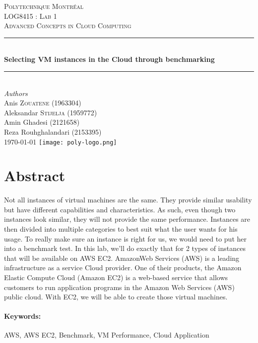 \documentclass[12pt]{article}
\begin{document}
\begin{titlepage} 
	\newcommand{\HRule}{\rule{\linewidth}{0.5mm}}
	\center
	\textsc{\LARGE Polytechnique Montréal}\\[1.5cm]
	\textsc{\Large LOG8415 : Lab 1}\\[0.5cm]
	\textsc{\large Advanced Concepts in Cloud Computing}\\[0.5cm]
	\HRule\\[0.4cm]
	{\huge\bfseries Selecting VM instances in the Cloud through
	benchmarking}\\[0.4cm]
	\HRule\\[1.5cm]
	{\large\textit{Authors}}\\
	Anis \textsc{Zouatene} (1963304)\\
	Aleksandar \textsc{Stijelja} (1959772)\\
	Amin Ghadesi\textsc{} (2121658)\\
        Reza Rouhghalandari \textsc{} (2153395)\\
	\vfill\vfill\vfill {\large\today} \vfill\vfill
	\texttt{[image: poly-logo.png]}\\[1cm]
	\vfill
\end{titlepage}


\section{Abstract}
	\paragraph{} Not all instances of virtual machines are the same. 
    They provide similar usability but have different capabilities 
    and characteristics. As such, even though two instances look similar, 
    they will not provide the same performance. Instances are then divided 
    into multiple categories to best suit what the user wants for his usage. 
    To really make sure an instance is right for us, we would need to put her 
    into a benchmark test. In this lab, we’ll do exactly that for 2 types of 
    instances that will be available on AWS EC2. AmazonWeb Services (AWS) is 
    a leading infrastructure as a service Cloud provider. One of their products, 
    the Amazon Elastic Compute Cloud (Amazon EC2) is a web-based service that 
    allows customers to run application programs in the Amazon Web Services (AWS) 
    public cloud. With EC2, we will be able to create those virtual machines.

	\paragraph{Keywords:}AWS, AWS EC2, Benchmark, VM Performance, Cloud Application
	\pagebreak
\end{document}
